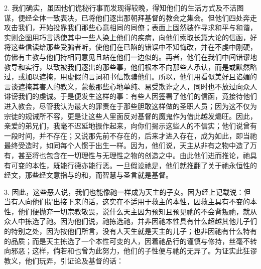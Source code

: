2. 我们确实，虽因他们诡秘行事而发现得较晚，得知他们的生活方式及不洁图谋，便经全体一致表决，已将他们逐出那朝拜基督的教会之集会。但他们四处奔走攻击我们，开始投靠我们那些心意相同的同僚；表面上固然装作寻求和平与和谐，实则企图用巧言诱使其中一些人染上他们的疾病，向他们索取长篇大论的信函，好将这些信读给那些受骗者听，使他们在已陷的错误中不知悔改，并在不虔中刚硬，仿佛有主教与他们持相同意见且站在他们一边似的。再者，他们在我们中间错谬地教导和实行，以致被我们逐出的那些事，他们根本不向那些人承认，而是或默然略过，或加以遮掩，用虚假的言词和书信欺骗他们。所以，他们用看似美好且谄媚的言谈遮掩其害人的教义，蒙蔽那些心地单纯、易受欺诈之人，同时也不放过向众人诽谤我们的虔诚。于是便发生这样的事：有些人因签署了他们的信函，竟接待他们进入教会，尽管我认为最大的罪责在于那些胆敢这样做的圣职人员；因为这不仅为宗徒的规诫所不容，更是让这些人里面反对基督的魔鬼作为借此越发煽旺。因此，亲爱的弟兄们，我毫不迟延地振作起来，向你们揭示这些人的不信实；他们说曾有一段时间，并不存在；又说那先前不存在的，后来才进入存在，成为如此，即当祂最终受造时，如同每个人惯于出生一样。因为，他们说，天主从非有之物中造了万有，甚至将也包含在一切理性与无理性之物的创造之中。由此他们进而推论，祂具有可变的本性，既能行德亦能行恶。一旦假设祂是，他们就推翻了关于祂永恒性的经文，那些经文意指与的和，而智慧与圣言就是基督。\par

3. 因此，这些恶人说，我们也能像祂一样成为天主的子女。因为经上记载说：但当有人向他们提出接下来的话，这实在不适用于救主的本性，因救主具有不变的本性，他们便抛弃一切宗教敬畏，说什么天主因为预知且预见祂的不会背叛祂，就从众人中拣选了祂。因为他们说，祂拣选祂，并非因祂本性具有什么超越其他儿子们的特别之处，因为按他们所言，没有人天生就是天主的儿子；也非因祂有什么特有的品质；而是天主拣选了一个本性可变的人，因着祂品行的谨慎与修持，丝毫不转向邪恶；这样，倘若和也曾为此努力，他们的子性便与祂的无异了。为证实此狂谬教义，他们玩弄，引证论及基督的话：\par

